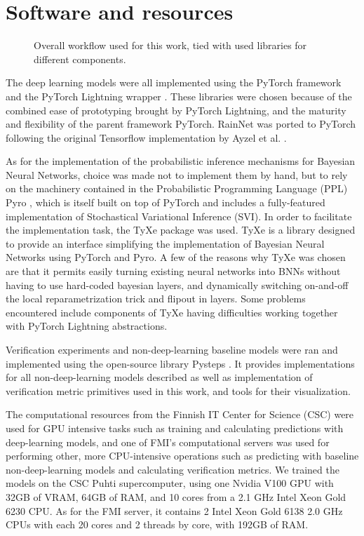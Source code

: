 \section{Software and resources}

\begin{figure}
	\label{fig:workflow}
	\caption{Overall workflow used for this work, tied with used libraries for different components.}
\end{figure}

The deep learning models were all implemented using the PyTorch framework and the PyTorch Lightning wrapper \cite{Falcon_PyTorch_Lightning_2019}. These libraries were chosen because of the combined ease of prototyping brought by PyTorch Lightning, and the maturity and flexibility of the parent framework PyTorch. RainNet was ported to PyTorch following the original Tensorflow implementation by Ayzel et al. \cite{Ayzel2020RainNet}. 

As for the implementation of the probabilistic inference mechanisms for Bayesian Neural Networks, choice was made not to implement them by hand, but to rely on the machinery contained in the Probabilistic Programming Language (PPL) Pyro \cite{bingham2018pyro}, which is itself built on top of PyTorch and includes a fully-featured implementation of Stochastical Variational Inference (SVI). In order to facilitate the implementation task, the TyXe package \cite{ritter2021tyxe} was used. TyXe is a library designed to provide an interface simplifying the implementation of Bayesian Neural Networks using PyTorch and Pyro. A few of the reasons why TyXe was chosen are that it permits easily turning existing neural networks into BNNs without having to use hard-coded bayesian layers, and dynamically switching on-and-off the local reparametrization trick and flipout in layers. Some problems encountered include components of TyXe having difficulties working together with PyTorch Lightning abstractions.

Verification experiments and non-deep-learning baseline models were ran and implemented using the open-source library Pysteps \cite{pulkkinen_pysteps_2019}. It provides implementations for all non-deep-learning models described as well as implementation of verification metric primitives used in this work, and tools for their visualization. 

The computational resources from the Finnish IT Center for Science (CSC) were used for GPU intensive tasks such as training and calculating predictions with deep-learning models, and one of FMI's computational servers was used for performing other, more CPU-intensive operations such as predicting with baseline non-deep-learning models and calculating verification metrics. We trained the models on the CSC Puhti supercomputer, using one Nvidia V100 GPU with 32GB of VRAM, 64GB of RAM, and 10 cores from a 2.1 GHz Intel Xeon Gold 6230 CPU. As for the FMI server, it contains 2 Intel Xeon Gold 6138 2.0 GHz CPUs with each 20 cores and 2 threads by core, with 192GB of RAM. 
